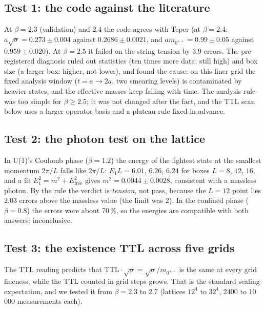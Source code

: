 \documentclass[11pt,a4paper]{article}
\begin{document}
\subsection{Test 1: the code against the literature}

At $\beta=2.3$ (validation) and $2.4$ the code agrees with Teper (at $\beta=2.4$: $a\sqrt\sigma=0.273\pm0.004$ against $0.2686\pm0.0021$, and
$am_{0^{++}}=0.99\pm0.05$ against $0.959\pm0.020$). At $\beta=2.5$ it failed on the string tension by 3.9 errors. The pre-registered
diagnosis ruled out statistics (ten times more data: still high) and box size (a larger box: higher, not lower), and found the cause: on
this finer grid the fixed analysis window ($t=a\to2a$, two smearing levels) is contaminated by heavier states, and the effective masses keep
falling with time. The analysis rule was too simple for $\beta\ge2.5$; it was not changed after the fact, and the TTL scan below uses a larger
operator basis and a plateau rule fixed in advance.

\subsection{Test 2: the photon test on the lattice}

In U(1)'s Coulomb phase ($\beta=1.2$) the energy of the lightest state at the smallest momentum $2\pi/L$ falls like $2\pi/L$: $E_1L=6.01$,
$6.26$, $6.24$ for boxes $L=8$, $12$, $16$, and a fit $E_1^2=m^2+E_\text{free}^2$ gives $m^2=0.0044\pm0.0028$, consistent with a massless
photon. By the rule the verdict is \emph{tension}, not pass, because the $L=12$ point lies 2.03 errors above the massless value (the limit
was 2). In the confined phase ($\beta=0.8$) the errors were about 70\,\%, so the energies are compatible with both answers: inconclusive.

\subsection{Test 3: the existence TTL across five grids}

The TTL reading predicts that $\mathrm{TTL}\cdot\sqrt\sigma=\sqrt\sigma/m_{0^{++}}$ is the same at every grid fineness, while the TTL counted
in grid steps grows. That is the standard scaling expectation, and we tested it from $\beta=2.3$ to $2.7$ (lattices $12^4$ to $32^4$,
2400 to 10\,000 measurements each).
\end{document}
